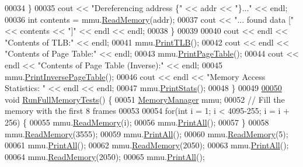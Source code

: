 \begin{DoxyCode}
00034         \}
00035         cout << \textcolor{stringliteral}{"Dereferencing address \{"} << addr << \textcolor{stringliteral}{"\}..."} << endl;
00036         \textcolor{keywordtype}{int} contents = mmu.\hyperlink{classMemoryManager_a4a716fc46ee321ebb25bd54bcc9d0524}{ReadMemory}(addr);
00037         cout << \textcolor{stringliteral}{"... found data ["} << contents << \textcolor{stringliteral}{"]"} << endl << endl;
00038     \}
00039 
00040     cout << endl << \textcolor{stringliteral}{"Contents of TLB:"} << endl;
00041     mmu.\hyperlink{classMemoryManager_a4bc5f491976e5253bf00a07a71b55ef6}{PrintTLB}();
00042     cout << endl << \textcolor{stringliteral}{"Contents of Page Table:"} << endl;
00043     mmu.\hyperlink{classMemoryManager_aa7437efdc1ebd09895d451e2c521857a}{PrintPageTable}();
00044     cout << endl << \textcolor{stringliteral}{"Contents of Page Table (Inverse):"} << endl;
00045     mmu.\hyperlink{classMemoryManager_a231141529c907c50de129169f16bedf1}{PrintInversePageTable}();
00046     cout << endl << \textcolor{stringliteral}{"Memory Access Statistics: "} << endl << endl;
00047     mmu.\hyperlink{classMemoryManager_ad0c7c13901cb9c6844aebf6bf9238c47}{PrintStats}();
00048 \}
00049 
\hypertarget{main_8cpp_source.tex_l00050}{}\hyperlink{main_8cpp_ac5347a09d49e669bd79b50bf65d74e7d}{00050} \textcolor{keywordtype}{void} \hyperlink{main_8cpp_ac5347a09d49e669bd79b50bf65d74e7d}{RunFullMemoryTests}() \{
00051     \hyperlink{classMemoryManager}{MemoryManager} mmu;
00052     \textcolor{comment}{// Fill the memory with the first 8 frames}
00053     
00054     \textcolor{keywordflow}{for}(\textcolor{keywordtype}{int} i = 1; i < 4095-255; i = i + 256) \{
00055         mmu.\hyperlink{classMemoryManager_a4a716fc46ee321ebb25bd54bcc9d0524}{ReadMemory}(i);
00056         mmu.\hyperlink{classMemoryManager_ae7bbb5231788516ca34caca3d428b0ef}{PrintAll}();
00057     \}
00058     mmu.\hyperlink{classMemoryManager_a4a716fc46ee321ebb25bd54bcc9d0524}{ReadMemory}(3555);
00059     mmu.\hyperlink{classMemoryManager_ae7bbb5231788516ca34caca3d428b0ef}{PrintAll}();
00060     mmu.\hyperlink{classMemoryManager_a4a716fc46ee321ebb25bd54bcc9d0524}{ReadMemory}(5);
00061     mmu.\hyperlink{classMemoryManager_ae7bbb5231788516ca34caca3d428b0ef}{PrintAll}();
00062     mmu.\hyperlink{classMemoryManager_a4a716fc46ee321ebb25bd54bcc9d0524}{ReadMemory}(2050);
00063     mmu.\hyperlink{classMemoryManager_ae7bbb5231788516ca34caca3d428b0ef}{PrintAll}();
00064     mmu.\hyperlink{classMemoryManager_a4a716fc46ee321ebb25bd54bcc9d0524}{ReadMemory}(2050);
00065     mmu.\hyperlink{classMemoryManager_ae7bbb5231788516ca34caca3d428b0ef}{PrintAll}();

\end{DoxyCode}
